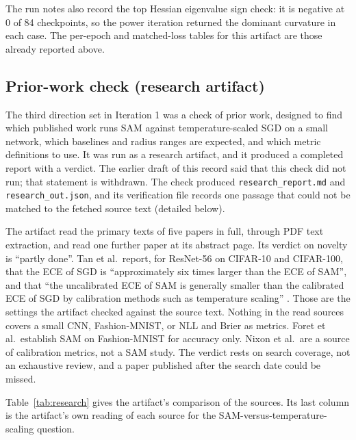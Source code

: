 \documentclass[11pt,letterpaper]{article}
\begin{document}
The run notes also record the top Hessian eigenvalue sign check: it is negative at 0 of 84 checkpoints, so the power iteration returned the dominant curvature in each case. The per-epoch and matched-loss tables for this artifact are those already reported above.

\subsection{Prior-work check (research artifact)}\label{sec:prior}

The third direction set in Iteration 1 was a check of prior work, designed to find which published work runs SAM against temperature-scaled SGD on a small network, which baselines and radius ranges are expected, and which metric definitions to use. It was run as a research artifact, and it produced a completed report with a verdict. The earlier draft of this record said that this check did not run; that statement is withdrawn. The check produced \texttt{research\_report.md} and \texttt{research\_out.json}, and its verification file records one passage that could not be matched to the fetched source text (detailed below).

The artifact read the primary texts of five papers in full, through PDF text extraction, and read one further paper at its abstract page. Its verdict on novelty is ``partly done''. Tan et al.\ report, for ResNet-56 on CIFAR-10 and CIFAR-100, that the ECE of SGD is ``approximately six times larger than the ECE of SAM'', and that ``the uncalibrated ECE of SAM is generally smaller than the calibrated ECE of SGD by calibration methods such as temperature scaling'' \citep{tan2026}. Those are the settings the artifact checked against the source text. Nothing in the read sources covers a small CNN, Fashion-MNIST, or NLL and Brier as metrics. Foret et al.\ establish SAM on Fashion-MNIST for accuracy only. Nixon et al.\ are a source of calibration metrics, not a SAM study. The verdict rests on search coverage, not an exhaustive review, and a paper published after the search date could be missed.

Table~\ref{tab:research} gives the artifact's comparison of the sources. Its last column is the artifact's own reading of each source for the SAM-versus-temperature-scaling question.
\end{document}
